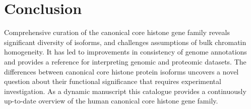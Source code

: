 \section{Conclusion}
\label{sec:conclusion}

  Comprehensive curation of the canonical core histone gene family
  reveals significant diversity of isoforms,
  and challenges assumptions of bulk chromatin homogeneity.
  It has led to improvements in consistency of genome annotations
  and provides a reference for interpreting genomic and proteomic datasets.
  The differences between canonical core histone protein isoforms
  uncovers a novel question about their functional significance
  that requires experimental investigation.
  As a dynamic manuscript this catalogue provides a continuously up-to-date overview
  of the human canonical core histone gene family.
